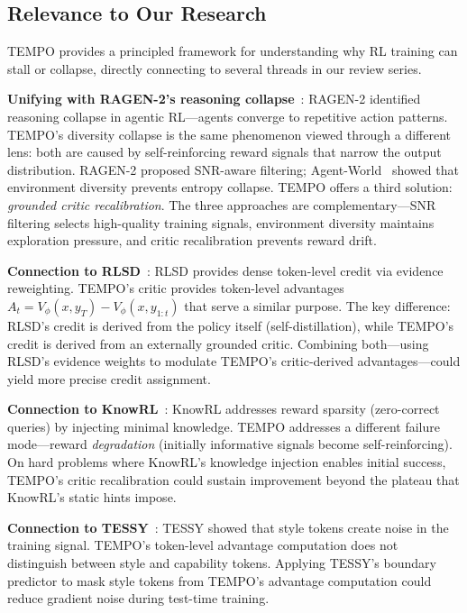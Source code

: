 \documentclass[11pt]{article}
\begin{document}
\subsection{Relevance to Our Research}

TEMPO provides a principled framework for understanding why RL training can stall or collapse, directly connecting to several threads in our review series.

\textbf{Unifying with RAGEN-2's reasoning collapse}~\cite{ragen2}: RAGEN-2 identified reasoning collapse in agentic RL---agents converge to repetitive action patterns. TEMPO's diversity collapse is the same phenomenon viewed through a different lens: both are caused by self-reinforcing reward signals that narrow the output distribution. RAGEN-2 proposed SNR-aware filtering; Agent-World~\cite{agentworld} showed that environment diversity prevents entropy collapse. TEMPO offers a third solution: \textit{grounded critic recalibration}. The three approaches are complementary---SNR filtering selects high-quality training signals, environment diversity maintains exploration pressure, and critic recalibration prevents reward drift.

\textbf{Connection to RLSD}~\cite{rlsd}: RLSD provides dense token-level credit via evidence reweighting. TEMPO's critic provides token-level advantages $A_t = V_\phi(x, y_T) - V_\phi(x, y_{1:t})$ that serve a similar purpose. The key difference: RLSD's credit is derived from the policy itself (self-distillation), while TEMPO's credit is derived from an externally grounded critic. Combining both---using RLSD's evidence weights to modulate TEMPO's critic-derived advantages---could yield more precise credit assignment.

\textbf{Connection to KnowRL}~\cite{knowrl}: KnowRL addresses reward sparsity (zero-correct queries) by injecting minimal knowledge. TEMPO addresses a different failure mode---reward \textit{degradation} (initially informative signals become self-reinforcing). On hard problems where KnowRL's knowledge injection enables initial success, TEMPO's critic recalibration could sustain improvement beyond the plateau that KnowRL's static hints impose.

\textbf{Connection to TESSY}~\cite{tessy}: TESSY showed that style tokens create noise in the training signal. TEMPO's token-level advantage computation does not distinguish between style and capability tokens. Applying TESSY's boundary predictor to mask style tokens from TEMPO's advantage computation could reduce gradient noise during test-time training.
\end{document}
